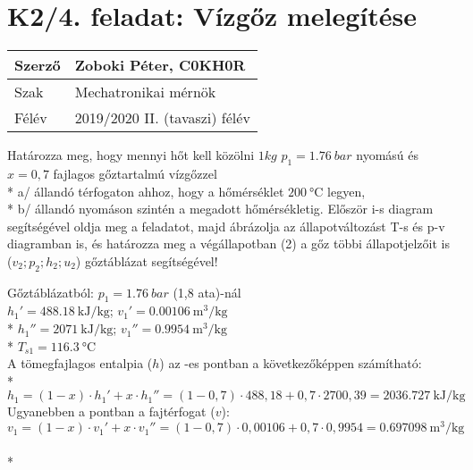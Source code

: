 \section*{K2/4. feladat: Vízgőz melegítése}

\begin{tabular}{ | p{2cm} | p{14cm} | } 
	\hline
	Szerző & Zoboki Péter, C0KH0R \\ 
	\hline
	Szak & Mechatronikai mérnök \\ 
	\hline
	Félév & 2019/2020 II. (tavaszi) félév \\ 
	\hline
\end{tabular}
\vspace{0.5cm}

\noindent Határozza meg, hogy mennyi hőt kell közölni $1 kg$ $p_1 = \SI{1,76}{bar}$ nyomású és $x = 0,7$ fajlagos gőztartalmú vízgőzzel \\* a/ állandó térfogaton ahhoz, hogy a hőmérséklet $\SI{200}{\celsius}$ legyen, \\*
b/ állandó nyomáson szintén a megadott hőmérsékletig. Először i-s diagram segítségével oldja meg a feladatot, majd ábrázolja az állapotváltozást T-s és p-v diagramban is, és határozza meg a végállapotban (2) a gőz többi állapotjelzőit is ($v_2;p_2;h_2;u_2$) gőztáblázat segítségével!  


\vspace{1cm}
Gőztáblázatból:
$p_1 = {\SI{1,76}{bar}}$ (1,8 ata)-nál	\\
$h_1' = {\SI{488,18}{\kJ\per\kilogram}}$; \quad $v_1' = {\SI{0,00106}{\meter\cubed\per\kilogram}}$	\\*
$h_1'' = {\SI{2071}{\kJ\per\kilogram}}$; \quad $v_1'' = {\SI{0,9954}{\meter\cubed\per\kilogram}}$ 	\\*
$T_{s1} = {\SI{116,3}{\celsius}}$ 	\\

\noindent A tömegfajlagos entalpia ($h$) az  -es pontban a következőképpen számítható: \\*
\begin{equation}
h_1=(1-x)\cdot h_1'+x\cdot h_1''=(1-0,7)\cdot 488,18+0,7\cdot 2700,39=\SI{2036,727}{\kJ\per\kilogram}
\end{equation}
\noindent Ugyanebben a pontban a fajtérfogat ($v$): 
\begin{equation}
v_1=(1-x)\cdot v_1'+x\cdot v_1''=(1-0,7)\cdot 0,00106+0,7\cdot0,9954=\SI{0,697098}{\meter\cubed\per\kilogram}
\end{equation} \\*
\newpage

